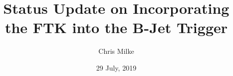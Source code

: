 \documentclass{beamer}
\begin{document}
\title{Status Update on Incorporating the FTK into the B-Jet Trigger}   
\author{Chris Milke} 
\date{29 July, 2019} 

\frame{\titlepage} 



\end{document}
